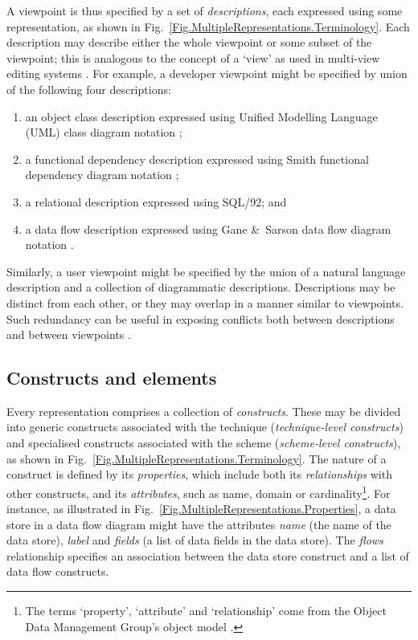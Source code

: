 \documentclass[11pt,oribibl]{llncs}
\begin{document}
A viewpoint is thus specified by a set of \emph{descriptions}, each expressed using some representation, as shown in Fig.~\ref{Fig.MultipleRepresentations.Terminology}. Each description may describe either the whole viewpoint or some subset of the viewpoint; this is analogous to the concept of a `view' as used in multi-view editing systems \cite{Brow:MH:1992:Zeus,Grun:JC:1993:PhD,Jaco:DA:1995:MultiView,Meye:S:1991:IEEE}. For example, a developer viewpoint might be specified by union of the following four descriptions:

\begin{enumerate}
	\item an object class description expressed using Unified Modelling Language (UML) class diagram notation \cite{Mull:PA:1997:UML};
	\item a functional dependency description expressed using Smith functional dependency diagram notation \cite{Smit:HC:1985,Stan:N:1999:Smith};
	\item a relational description expressed using SQL/92; and
	\item a data flow description expressed using Gane \&~Sarson data flow diagram notation \cite{Gane:C:1979}.
\end{enumerate}

Similarly, a user viewpoint might be specified by the union of a natural language description and a collection of diagrammatic descriptions. Descriptions may be distinct from each other, or they may overlap in a manner similar to viewpoints. Such redundancy can be useful in exposing conflicts both between descriptions and between viewpoints \cite{East:SM:1991:PhD}.


\subsection{Constructs and elements}
\label{Sec:MultipleRepresentations:Representations:Constructs}

Every representation comprises a collection of \emph{constructs}. These may be divided into generic constructs associated with the technique (\emph{technique-level constructs}) and specialised constructs associated with the scheme (\emph{scheme-level constructs}), as shown in Fig.~\ref{Fig.MultipleRepresentations.Terminology}. The nature of a construct is defined by its \emph{properties}, which include both its \emph{relationships} with other constructs, and its \emph{attributes}, such as name, domain or cardinality\footnote{The terms `property', `attribute' and `relationship' come from the Object Data Management Group's object model \cite{Catt:RGG:2000:ODMG3}.}. For instance, as illustrated in Fig.~\ref{Fig.MultipleRepresentations.Properties}, a data store in a data flow diagram might have the attributes \emph{name} (the name of the data store), \emph{label} and \emph{fields} (a list of data fields in the data store). The \emph{flows} relationship specifies an association between the data store construct and a list of data flow constructs.
\end{document}
